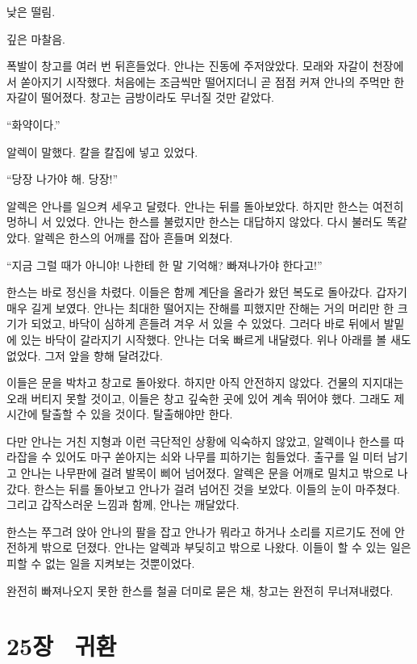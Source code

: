 낮은 떨림.

깊은 마찰음.

폭발이 창고를 여러 번 뒤흔들었다. 안나는 진동에 주저앉았다. 모래와 자갈이 천장에서 쏟아지기 시작했다. 처음에는 조금씩만 떨어지더니 곧 점점 커져 안나의 주먹만 한 자갈이 떨어졌다. 창고는 금방이라도 무너질 것만 같았다.

``화약이다.''

알렉이 말했다. 칼을 칼집에 넣고 있었다.

``당장 나가야 해. 당장!''

알렉은 안나를 일으켜 세우고 달렸다. 안나는 뒤를 돌아보았다. 하지만 한스는 여전히 멍하니 서 있었다. 안나는 한스를 불렀지만 한스는 대답하지 않았다. 다시 불러도 똑같았다. 알렉은 한스의 어깨를 잡아 흔들며 외쳤다.

``지금 그럴 때가 아니야! 나한테 한 말 기억해? 빠져나가야 한다고!''

한스는 바로 정신을 차렸다. 이들은 함께 계단을 올라가 왔던 복도로 돌아갔다. 갑자기 매우 길게 보였다. 안나는 최대한 떨어지는 잔해를 피했지만 잔해는 거의 머리만 한 크기가 되었고, 바닥이 심하게 흔들려 겨우 서 있을 수 있었다. 그러다 바로 뒤에서 발밑에 있는 바닥이 갈라지기 시작했다. 안나는 더욱 빠르게 내달렸다. 위나 아래를 볼 새도 없었다. 그저 앞을 향해 달려갔다.

이들은 문을 박차고 창고로 돌아왔다. 하지만 아직 안전하지 않았다. 건물의 지지대는 오래 버티지 못할 것이고, 이들은 창고 깊숙한 곳에 있어 계속 뛰어야 했다. 그래도 제시간에 탈출할 수 있을 것이다. 탈출해야만 한다.

다만 안나는 거친 지형과 이런 극단적인 상황에 익숙하지 않았고, 알렉이나 한스를 따라잡을 수 있어도 마구 쏟아지는 쇠와 나무를 피하기는 힘들었다. 출구를 일 미터 남기고 안나는 나무판에 걸려 발목이 삐어 넘어졌다. 알렉은 문을 어깨로 밀치고 밖으로 나갔다. 한스는 뒤를 돌아보고 안나가 걸려 넘어진 것을 보았다. 이들의 눈이 마주쳤다. 그리고 갑작스러운 느낌과 함께, 안나는 깨달았다.

한스는 쭈그려 앉아 안나의 팔을 잡고 안나가 뭐라고 하거나 소리를 지르기도 전에 안전하게 밖으로 던졌다. 안나는 알렉과 부딪히고 밖으로 나왔다. 이들이 할 수 있는 일은 피할 수 없는 일을 지켜보는 것뿐이었다.

완전히 빠져나오지 못한 한스를 철골 더미로 묻은 채, 창고는 완전히 무너져내렸다.



\chapter[25장  귀환][25장\hspace*{.5em}귀환]{25장 \ 귀환}



